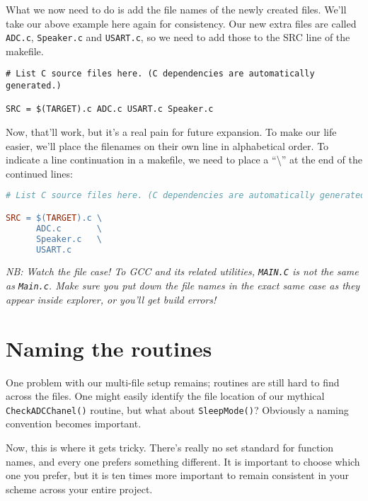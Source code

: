 \documentclass[a4paper,oneside]{book}
\begin{document}
What we now need to do is add the file names of the newly created files. We'll take our above example here again for consistency. Our new extra files are called \texttt{ADC.c}, \texttt{Speaker.c} and \texttt{USART.c}, so we need to add those to the SRC line of the makefile.

\begin{center}
\begin{lstlisting}
# List C source files here. (C dependencies are automatically generated.)

SRC = $(TARGET).c ADC.c USART.c Speaker.c
\end{lstlisting}
\end{center}

Now, that'll work, but it's a real pain for future expansion. To make our life easier, we'll place the filenames on their own line in alphabetical order. To indicate a line continuation in a makefile, we need to place a ``\textbackslash'' at the end of the continued lines:

\begin{center}
\begin{lstlisting}[language=make]
# List C source files here. (C dependencies are automatically generated.)

SRC = $(TARGET).c \
      ADC.c       \
      Speaker.c   \
      USART.c
\end{lstlisting}
\end{center}

\textit{NB: Watch the file case! To GCC and its related utilities, \texttt{MAIN.C} is not the same as \texttt{Main.c}. Make sure you put down the file names in the exact same case as they appear inside explorer, or you'll get build errors!}

\section{Naming the routines}

One problem with our multi-file setup remains; routines are still hard to find across the files. One might easily identify the file location of our mythical \texttt{CheckADCChanel()} routine, but what about \texttt{SleepMode()}? Obviously a naming convention becomes important.

Now, this is where it gets tricky. There's really no set standard for function names, and every one prefers something different. It is important to choose which one you prefer, but it is ten times more important to remain consistent in your scheme across your entire project.
\end{document}
